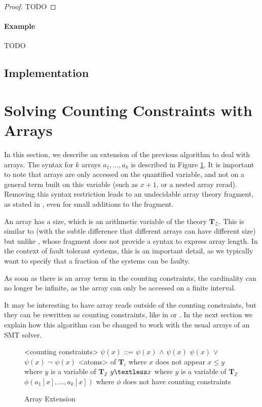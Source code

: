 \documentclass[]{article}
\begin{document}
\begin{proof}TODO\end{proof}

\paragraph{Example}\label{example}

TODO

\subsection{Implementation}

\section{Solving Counting Constraints with
Arrays}\label{solving-counting-constraints-with-arrays}

In this section, we describe an extension of the previous algorithm to
deal with arrays. The syntax for $k$ arrays $a_1, \ldots, a_k$ is
described in Figure \ref{syntaxarray}. It is important to note that
arrays are only accessed on the quantified variable, and not on a
general term built on this variable (such as $x + 1$, or a nested
array rerad). Removing this syntax restriction leads to an undecidable
array theory fragment, as stated in
\cite{bradley2006s}, even for small additions to the
fragment.

An array has a size, which is an arithmetic variable of the theory
$\mathbf{T}_\mathcal{Z}$. This is similar to
\cite{AlbertiGP16} (with the subtle difference that
different arrays can have different size) but unlike
\cite{ConchonGKMZ12}, whose fragment does not
provide a syntax to express array length. In the context of fault
tolerant systems, this is an important detail, as we typically want to
specify that a fraction of the systems can be faulty.

As soon as there is an array term in the counting constraints, the
cardinality can no longer be infinite, as the array can only be accessed
on a finite interval.

It may be interesting to have array reads outside of the counting
constraints, but they can be rewritten as counting constraints, like in
\cite{bradley2006s} or
\cite{AlbertiGP16}. In the next section we explain
how this algorithm can be changed to work with the usual arrays of an
SMT solver.

\begin{figure}[h]
\begin{grammar}
    
<counting constraints> $\psi(x)$ ::= $\psi(x)$ $\land$ $\psi(x)$
\alt $\psi(x)$ $\lor$ $\psi(x)$
\alt $\lnot$ $\psi(x)$
\alt <atoms> of $\mathbf{T}_i$ where $x$ does not appear
\alt $x \leq y$ where $y$ is a variable of $\mathbf{T}_\mathbb{Z}$
\alt $y \textless x$ where $y$ is a variable of $\mathbf{T}_\mathbb{Z}$
\alt $\phi(a_1[x], \ldots, a_k[x])$ where $\phi$ does not have counting constraints


\end{grammar}
\caption{Array Extension}
\label{syntaxarray}
\end{figure}
\end{document}
